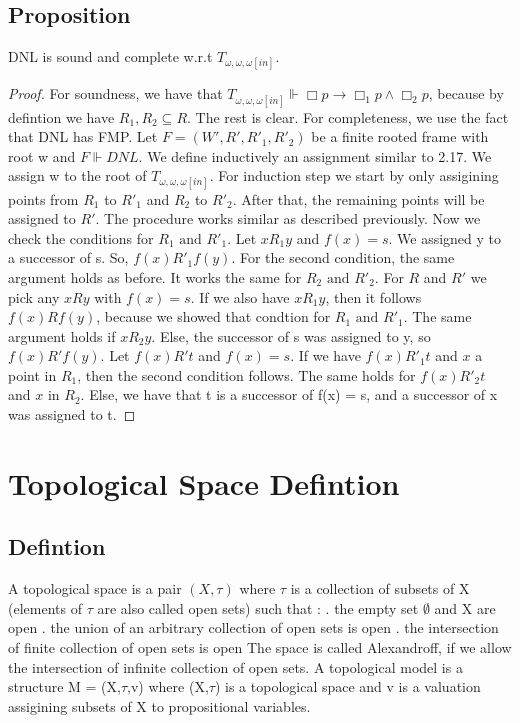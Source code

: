 \documentclass[12pt, a4paper]{scrreprt}
\begin{document}
\section{Proposition}
DNL is sound and complete w.r.t $T_{\omega,\omega,\omega[in]}$.

\begin{proof}
For soundness, we have that $T_{\omega,\omega,\omega[in]} \Vdash \Box p \rightarrow \Box_1 p \land \Box_2p$, because by defintion we have $R_1,R_2 \subseteq R$. The rest is clear.
For completeness, we use the fact that DNL has FMP. Let $F = (W',R', R'_1, R'_2)$ be a finite rooted frame with root w and $F \Vdash DNL$. We define inductively an
assignment similar to 2.17. We assign w to the root of $T_{\omega,\omega,\omega[in]}$. For induction step we start by only assigining points from $R_1$ to $R'_1$ and $R_2$ to $R'_2$. After that, the remaining points will be assigned to $R'$.
The procedure works similar as described previously. \newline
Now we check the conditions for $R_1 \mbox{ and } R'_1$. Let $xR_1y$ and $f(x) = s$. We assigned y to a successor of s. So, $f(x) R'_1f(y)$. For the second condition, the same argument holds as before.
It works the same for $R_2 \mbox{ and } R'_2$. For $R$ and $R'$ we pick any $xRy$ with $f(x) = s$. 
If we also have $xR_1y$, then it follows $f(x)Rf(y)$, because we showed that condtion for $R_1 \mbox{ and } R'_1$. The same argument holds if $xR_2y$. Else, the successor of s was assigned to y, so $f(x)R'f(y)$. 
Let $f(x)R't$ and $f(x) = s$. If we have $f(x) R'_1 t$  and $x$ a point in $R_1$, then the second condition follows. The same holds for $f(x)R'_2t$ and $x$ in $R_2$.
Else, we have that t is a successor of f(x) = s, and a successor of x was assigned to t.
\end{proof}





\chapter{Topological Space Defintion}

\section{Defintion}

A topological space is a pair $(X, \tau)$ where $\tau$ is a collection of subsets of X (elements of $\tau$ are also called open sets) such that : 
\newline
{}. the empty set $\emptyset $ and X are open
. the union of an arbitrary collection of open sets is open
. the intersection of finite collection of open sets is open
\newline
\newline
The space is called Alexandroff, if we allow the intersection of infinite collection of open sets.
A topological model is a structure M = (X,$\tau$,v) where (X,$\tau$) is a topological space
and v is a valuation assigining subsets of X to propositional variables. 
\end{document}
